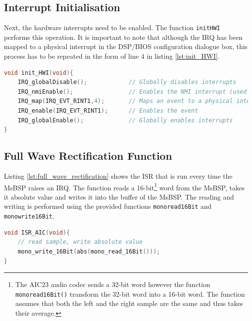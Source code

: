 \documentclass{article}
\begin{document}
\subsection{Interrupt Initialisation}

Next, the hardware interrupts need to be enabled. The function {\tt init\textunderscore HWI} performs this operation. It is important to note that although the IRQ has been mapped to a physical interrupt in the DSP/BIOS configuration dialogue box, this process has to be repeated in the form of line 4 in listing \ref{lst:init_HWI}.\\

\begin{lstlisting}[language=C, frame=single, caption=Interrupt initialisation for exercise 1, label = lst:init_HWI]
void init_HWI(void){
    IRQ_globalDisable();            // Globally disables interrupts
    IRQ_nmiEnable();                // Enables the NMI interrupt (used by the debugger)
    IRQ_map(IRQ_EVT_RINT1,4);       // Maps an event to a physical interrupt
    IRQ_enable(IRQ_EVT_RINT1);      // Enables the event
    IRQ_globalEnable();             // Globally enables interrupts
} 
\end{lstlisting}

\subsection{Full Wave Rectification Function}

Listing \ref{lst:full_wave_rectification} shows the ISR that is run every time the MsBSP raises an IRQ. The function reads a 16-bit\footnote{The AIC23 audio codec sends a 32-bit word however the function {\tt mono\textunderscore read\textunderscore 16Bit()} transform the 32-bit word into a 16-bit word. The function assumes that both the left and the right sample are the same and thus takes their average.} word from the MsBSP, takes it absolute value and writes it into the buffer of the MsBSP. The reading and writing is performed using the provided functions {\tt mono\textunderscore read\textunderscore 16Bit} and {\tt mono\textunderscore write\textunderscore 16Bit}.\\

\begin{lstlisting}[language=C, frame=single, caption=ISR\_AIC rectification function, label = lst:full_wave_rectification]
void ISR_AIC(void){
    // read sample, write absolute value
    mono_write_16Bit(abs(mono_read_16Bit()));
} 
\end{lstlisting}
\end{document}
